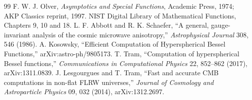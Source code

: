 \documentclass[11pt,a4paper]{article}
\begin{document}
\begin{thebibliography}{99}
F. W. J. Olver, \emph{Asymptotics and Special Functions}, Academic Press, 1974; AKP Classics reprint, 1997.
NIST Digital Library of Mathematical Functions, Chapters 9, 10 and 18.
L. F. Abbott and R. K. Schaefer, ``A general, gauge-invariant analysis of the cosmic microwave anisotropy,'' \emph{Astrophysical Journal} 308, 546 (1986).
A. Kosowsky, ``Efficient Computation of Hyperspherical Bessel Functions,'' arXiv:astro-ph/9805173.
T. Tram, ``Computation of hyperspherical Bessel functions,'' \emph{Communications in Computational Physics} 22, 852--862 (2017), arXiv:1311.0839.
J. Lesgourgues and T. Tram, ``Fast and accurate CMB computations in non-flat FLRW universes,'' \emph{Journal of Cosmology and Astroparticle Physics} 09, 032 (2014), arXiv:1312.2697.
\end{thebibliography}
\end{document}
